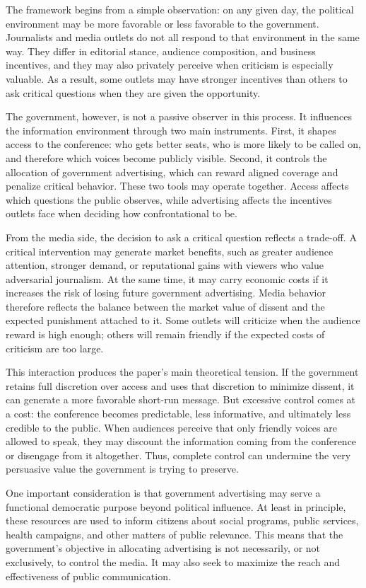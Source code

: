 \documentclass[12pt]{article}
\begin{document}
The framework begins from a simple observation: on any given day, the political environment may be more favorable or less favorable to the government. Journalists and media outlets do not all respond to that environment in the same way. They differ in editorial stance, audience composition, and business incentives, and they may also privately perceive when criticism is especially valuable. As a result, some outlets may have stronger incentives than others to ask critical questions when they are given the opportunity.

The government, however, is not a passive observer in this process. It influences the information environment through two main instruments. First, it shapes access to the conference: who gets better seats, who is more likely to be called on, and therefore which voices become publicly visible. Second, it controls the allocation of government advertising, which can reward aligned coverage and penalize critical behavior. These two tools may operate together. Access affects which questions the public observes, while advertising affects the incentives outlets face when deciding how confrontational to be.

From the media side, the decision to ask a critical question reflects a trade-off. A critical intervention may generate market benefits, such as greater audience attention, stronger demand, or reputational gains with viewers who value adversarial journalism.  At the same time, it may carry economic costs if it increases the risk of losing future government advertising. Media behavior therefore reflects the balance between the market value of dissent and the expected punishment attached to it. Some outlets will criticize when the audience reward is high enough; others will remain friendly if the expected costs of criticism are too large.

This interaction produces the paper's main theoretical tension. If the government retains full discretion over access and uses that discretion to minimize dissent, it can generate a more favorable short-run message. But excessive control comes at a cost: the conference becomes predictable, less informative, and ultimately less credible to the public. When audiences perceive that only friendly voices are allowed to speak, they may discount the information coming from the conference or disengage from it altogether. Thus, complete control can undermine the very persuasive value the government is trying to preserve.

One important consideration is that government advertising may serve a functional democratic purpose beyond political influence. At least in principle, these resources are used to inform citizens about social programs, public services, health campaigns, and other matters of public relevance. This means that the government’s objective in allocating advertising is not necessarily, or not exclusively, to control the media. It may also seek to maximize the reach and effectiveness of public communication.
\end{document}
